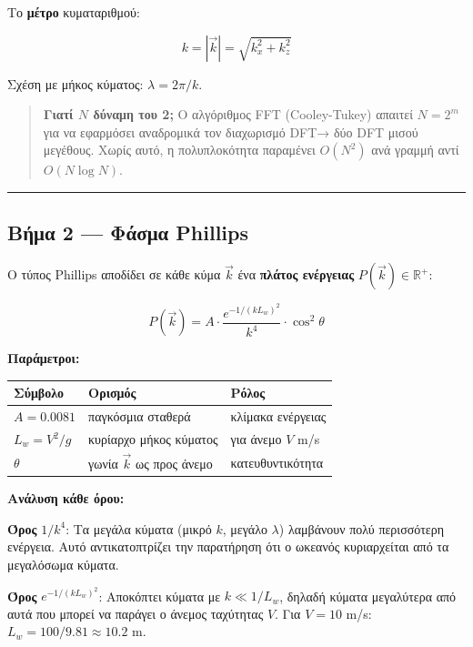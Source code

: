 \documentclass[a4paper, 11pt]{article}
\begin{document}
Το \textbf{μέτρο} κυματαριθμού:

\[k = |\vec{k}| = \sqrt{k_x^2 + k_z^2}\]

Σχέση με μήκος κύματος: \(\lambda = 2\pi / k\).

\begin{quote}
\textbf{Γιατί \(N\) δύναμη του 2;} Ο αλγόριθμος FFT (Cooley-Tukey)
απαιτεί \(N = 2^m\) για να εφαρμόσει αναδρομικά τον διαχωρισμό DFT→ δύο
DFT μισού μεγέθους. Χωρίς αυτό, η πολυπλοκότητα παραμένει \(O(N^2)\) ανά
γραμμή αντί \(O(N \log N)\).
\end{quote}

\begin{center}\rule{0.5\linewidth}{0.5pt}\end{center}

\subsection{Βήμα 2 --- Φάσμα
Phillips}\label{ux3b2ux3aeux3bcux3b1-2-ux3c6ux3acux3c3ux3bcux3b1-phillips}

Ο τύπος Phillips αποδίδει σε κάθε κύμα \(\vec{k}\) ένα \textbf{πλάτος
ενέργειας} \(P(\vec{k}) \in \mathbb{R}^+\):

\[\boxed{P(\vec{k}) = A \cdot \frac{e^{-1/(k L_w)^2}}{k^4} \cdot \cos^2\theta}\]

\textbf{Παράμετροι:}

\begin{longtable}[]{@{}lll@{}}
\toprule\noalign{}
Σύμβολο & Ορισμός & Ρόλος \\
\midrule\noalign{}
\endhead
\bottomrule\noalign{}
\endlastfoot
\(A = 0.0081\) & παγκόσμια σταθερά & κλίμακα ενέργειας \\
\(L_w = V^2/g\) & κυρίαρχο μήκος κύματος & για άνεμο \(V\) m/s \\
\(\theta\) & γωνία \(\vec{k}\) ως προς άνεμο & κατευθυντικότητα \\
\end{longtable}

\textbf{Ανάλυση κάθε όρου:}

\textbf{Όρος} \(1/k^4\): Τα μεγάλα κύματα (μικρό \(k\), μεγάλο
\(\lambda\)) λαμβάνουν πολύ περισσότερη ενέργεια. Αυτό αντικατοπτρίζει
την παρατήρηση ότι ο ωκεανός κυριαρχείται από τα μεγαλόσωμα κύματα.

\textbf{Όρος} \(e^{-1/(kL_w)^2}\): Αποκόπτει κύματα με \(k \ll 1/L_w\),
δηλαδή κύματα μεγαλύτερα από αυτά που μπορεί να παράγει ο άνεμος
ταχύτητας \(V\). Για \(V = 10\) m/s: \(L_w = 100/9.81 \approx 10.2\) m.
\end{document}
